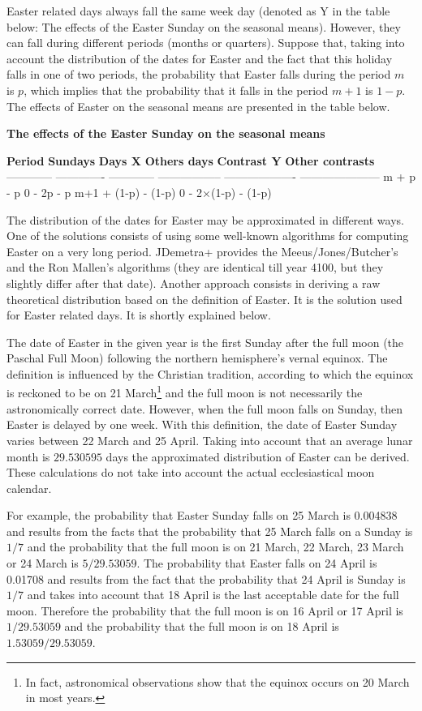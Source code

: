 \documentclass[
  letterpaper,
  DIV=11,
  numbers=noendperiod]{scrreprt}
\begin{document}
Easter related days always fall the same week day (denoted as Y in the
table below: The effects of the Easter Sunday on the seasonal means).
However, they can fall during different periods (months or quarters).
Suppose that, taking into account the distribution of the dates for
Easter and the fact that this holiday falls in one of two periods, the
probability that Easter falls during the period \(m\) is \(p\), which
implies that the probability that it falls in the period \(m + 1\) is
\(1 - p\). The effects of Easter on the seasonal means are presented in
the table below.

\textbf{The effects of the Easter Sunday on the seasonal means}

\textbar{}\textbf{Period} \textbar{} \textbf{Sundays} \textbf{Days X}
\textbf{Others days} \textbf{Contrast Y} \textbf{Other contrasts}
\textbar------------\textbar{} ------------- ------------
----------------- ------------------- --------------------- \textbar m
\textbar+ p - p 0 - 2p - p \textbar m+1 \textbar{} + (1-p) - (1-p) 0 -
2\(\times\)(1-p) - (1-p)

The distribution of the dates for Easter may be approximated in
different ways. One of the solutions consists of using some well-known
algorithms for computing Easter on a very long period. JDemetra+
provides the Meeus/Jones/Butcher's and the Ron Mallen's algorithms (they
are identical till year 4100, but they slightly differ after that date).
Another approach consists in deriving a raw theoretical distribution
based on the definition of Easter. It is the solution used for Easter
related days. It is shortly explained below.

The date of Easter in the given year is the first Sunday after the full
moon (the Paschal Full Moon) following the northern hemisphere's vernal
equinox. The definition is influenced by the Christian tradition,
according to which the equinox is reckoned to be on 21 March\footnote{In
  fact, astronomical observations show that the equinox occurs on 20
  March in most years.} and the full moon is not necessarily the
astronomically correct date. However, when the full moon falls on
Sunday, then Easter is delayed by one week. With this definition, the
date of Easter Sunday varies between 22 March and 25 April. Taking into
account that an average lunar month is \(29.530595\) days the
approximated distribution of Easter can be derived. These calculations
do not take into account the actual ecclesiastical moon calendar.

For example, the probability that Easter Sunday falls on 25 March is
0.004838 and results from the facts that the probability that 25 March
falls on a Sunday is \(1/7\) and the probability that the full moon is
on 21 March, 22 March, 23 March or 24 March is \(5/29.53059\). The
probability that Easter falls on 24 April is 0.01708 and results from
the fact that the probability that 24 April is Sunday is \(1/7\) and
takes into account that 18 April is the last acceptable date for the
full moon. Therefore the probability that the full moon is on 16 April
or 17 April is \(1/29.53059\) and the probability that the full moon is
on 18 April is \(1.53059/29.53059\).
\end{document}
